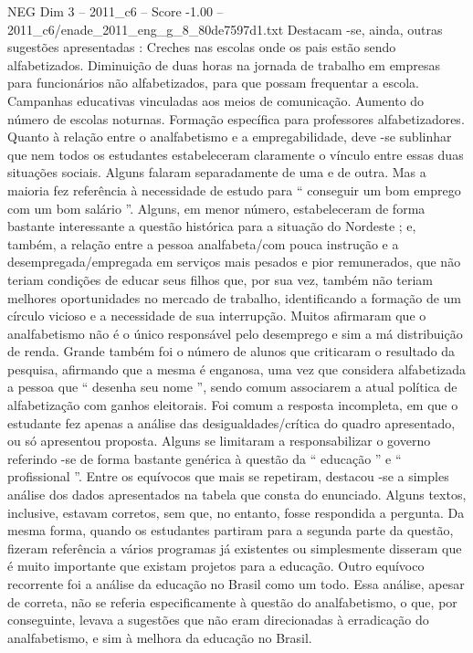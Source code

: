 \begin{textsample}{NEG Dim 3 – 2011\_c6 – Score -1.00 – 2011\_c6/enade\_2011\_eng\_g\_8\_80de7597d1.txt}
Destacam -se, ainda, outras sugestões apresentadas : Creches nas escolas onde os pais estão sendo alfabetizados.
Diminuição de duas horas na jornada de trabalho em empresas para funcionários não alfabetizados, para que possam frequentar a escola.
Campanhas educativas vinculadas aos meios de comunicação.
Aumento do número de escolas noturnas.
Formação específica para professores alfabetizadores.
Quanto à relação entre o analfabetismo e a empregabilidade, deve -se sublinhar que nem todos os estudantes estabeleceram claramente o vínculo entre essas duas situações sociais.
Alguns falaram separadamente de uma e de outra.
Mas a maioria fez referência à necessidade de estudo para “ conseguir um bom emprego com um bom salário ”.
Alguns, em menor número, estabeleceram de forma bastante interessante a questão histórica para a situação do Nordeste ; e, também, a relação entre a pessoa analfabeta/com pouca instrução e a desempregada/empregada em serviços mais pesados e pior remunerados, que não teriam condições de educar seus filhos que, por sua vez, também não teriam melhores oportunidades no mercado de trabalho, identificando a formação de um círculo vicioso e a necessidade de sua interrupção.
Muitos afirmaram que o analfabetismo não é o único responsável pelo desemprego e sim a má distribuição de renda.
Grande também foi o número de alunos que criticaram o resultado da pesquisa, afirmando que a mesma é enganosa, uma vez que considera alfabetizada a pessoa que “ desenha seu nome ”, sendo comum associarem a atual política de alfabetização com ganhos eleitorais.
Foi comum a resposta incompleta, em que o estudante fez apenas a análise das desigualdades/crítica do quadro apresentado, ou só apresentou proposta.
Alguns se limitaram a responsabilizar o governo referindo -se de forma bastante genérica à questão da “ educação ” e “ profissional ”.
Entre os equívocos que mais se repetiram, destacou -se a simples análise dos dados apresentados na tabela que consta do enunciado.
Alguns textos, inclusive, estavam corretos, sem que, no entanto, fosse respondida a pergunta.
Da mesma forma, quando os estudantes partiram para a segunda parte da questão, fizeram referência a vários programas já existentes ou simplesmente disseram que é muito importante que existam projetos para a educação.
Outro equívoco recorrente foi a análise da educação no Brasil como um todo.
Essa análise, apesar de correta, não se referia especificamente à questão do analfabetismo, o que, por conseguinte, levava a sugestões que não eram direcionadas à erradicação do analfabetismo, e sim à melhora da educação no Brasil.

\end{textsample}
